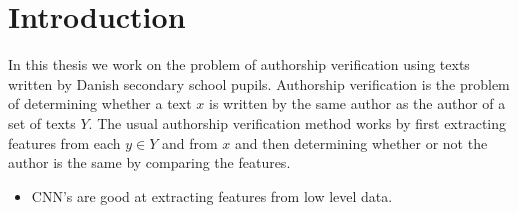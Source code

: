 \section{Introduction} \label{sec:introduction}

In this thesis we work on the problem of authorship verification using texts
written by Danish secondary school pupils. Authorship verification is the
problem of determining whether a text $x$ is written by the same author as the
author of a set of texts $Y$. The usual authorship verification method works by
first extracting features from each $y \in Y$ and from $x$ and then determining
whether or not the author is the same by comparing the features.

\begin{itemize}
    \item CNN's are good at extracting features from low level data.
\end{itemize}
